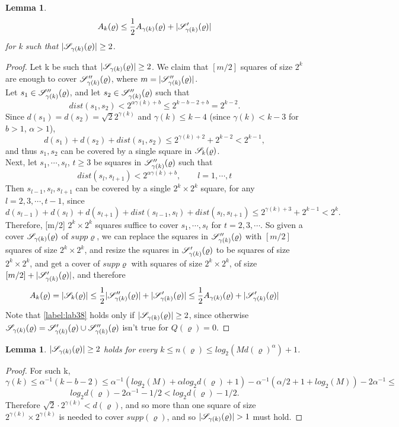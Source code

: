 \documentclass[11pt,reqno]{article}
\DeclarePairedDelimiter\abs{\lvert}{\rvert}%
\newtheorem{lemma}[thm]{Lemma}
\theoremstyle{definition}
\begin{document}
\begin{lemma} \label{lemma:GammaReason}
\begin{equation} \label{label:GammaRec}
A_k(\varrho) \leq \frac{1}{2} A_{\gamma(k)}(\varrho) + \abs{\SqrsSetTagGamma}
\end{equation}
for k such that $\abs{\SqrsSetGamma} \geq 2$.
\end{lemma}

\begin{proof}
Let k be such that $\abs{\SqrsSetGamma} \geq 2$. We claim that $[m/2]$ squares of size $2^k$ are enough to cover $\mathscr{S}^{\prime\prime}_{\gamma(k)}(\varrho)$, where $m=\abs{\SqrsSetDtagGamma}$.\\
Let $s_1 \in \mathscr{S}^{\prime\prime}_{\gamma(k)}(\varrho)$, and let $s_2 \in \mathscr{S}^{\prime\prime}_{\gamma(k)}(\varrho)$ such that $$dist(s_1, s_2) < 2^{\alpha \gamma(k) + b} \leq 2^{k-b-2 + b} = 2^{k-2}.$$
Since $d(s_1)=d(s_2)=\sqrt{2} 2^{\gamma(k)}$ and $\gamma(k) \leq k-4$ (since $\gamma(k) < k-3$ for $b>1$, $\alpha > 1$), 
$$d(s_1) + d(s_2) + dist(s_1, s_2) \leq 2^{\gamma(k) + 2} + 2^{k-2} < 2^{k-1},$$
and thus $s_1, s_2$ can be covered by a single square in $\mathscr{S}_k(\varrho)$.\\
Next, let $s_1, \cdots, s_t$, $t \geq 3$ be squares in $\mathscr{S}^{\prime\prime}_{\gamma(k)}(\varrho)$ such that
$$dist(s_l, s_{l+1}) < 2^{\alpha \gamma(k) + b}, \qquad l=1,\cdots,t$$
Then $s_{l-1}, s_l, s_{l+1}$ can be covered by a single $2^k\times2^k$ square, for any $l=2,3,\cdots,t-1$, since
$$d(s_{l-1}) + d(s_l) + d(s_{l+1}) + dist(s_{l-1}, s_l) + dist(s_l, s_{l+1}) \leq 2^{\gamma(k) + 3} + 2^{k-1} < 2^k.$$
Therefore, [m/2] $2^k\times2^k$ squares suffice to cover $s_1, \cdots, s_t$ for $t=2,3,\cdots$. So given a cover $\mathscr{S}_{\gamma(k)}(\varrho)$ of $supp\varrho$, we can replace the squares in $\mathscr{S}^{\prime\prime}_{\gamma(k)}(\varrho)$ with $[m/2]$ squares of size $2^k\times2^k$, and resize the squares in $\mathscr{S}^\prime_{\gamma(k)}(\varrho)$ to be squares of size $2^k\times2^k$, and get a cover of $supp\varrho$ with squares of size $2^k\times2^k$, of size $[m/2] + \abs{\SqrsSetTagGamma}$, and therefore
\begin{equation} \label{label:lab38}
A_k(\varrho) = \abs{\SqrsSet} \leq
\frac{1}{2}\abs{\SqrsSetDtagGamma} + \abs{\SqrsSetTagGamma} \leq
\frac{1}{2} A_{\gamma(k)}(\varrho) + \abs{\SqrsSetTagGamma}
\end{equation}
Note that \eqref{label:lab38} holds only if $\abs{\SqrsSetGamma} \geq 2$, since otherwise $\mathscr{S}_{\gamma(k)}(\varrho) = \mathscr{S}^\prime_{\gamma(k)}(\varrho) \cup \mathscr{S}^{\prime\prime}_{\gamma(k)}(\varrho)$ isn't true for $Q(\varrho)=0$.
\end{proof}

\begin{lemma} \label{lemma:GammaCond}
$\abs{\SqrsSetGamma} \geq 2$ holds for every $k \leq n(\varrho) \leq log_2(Md(\varrho)^\alpha) + 1$.
\end{lemma}
\begin{proof}
For such k, 
$$\gamma(k) \leq \alpha^{-1}(k-b-2) \leq
\alpha^{-1}(log_2(M) + \alpha log_2d(\varrho) + 1) - \alpha^{-1}(\alpha/2 + 1 + log_2(M)) - 2\alpha^{-1} \leq $$
$$log_2d(\varrho) - 2\alpha^{-1} - 1/2 < 
log_2d(\varrho)-1/2.$$
Therefore $\sqrt{2}\cdot2^{\gamma(k)} < d(\varrho)$, and so more than one square of size $2^{\gamma(k)}\times2^{\gamma(k)}$ is needed to cover $supp(\varrho)$, and so $\abs{\SqrsSetGamma} > 1$ must hold.
\end{proof}
\end{document}
